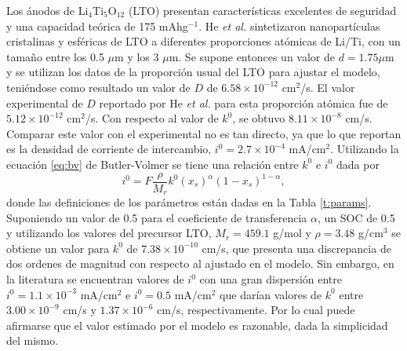 Los ánodos de Li$_4$Ti$_5$O$_{12}$ (LTO) presentan características excelentes
de seguridad y una capacidad teórica de 175 mAhg$^{-1}$. He \textit{et al.} 
\cite{he2012} sintetizaron nanopartículas cristalinas y esféricas de LTO a 
diferentes proporciones atómicas de Li/Ti, con un tamaño entre los 0.5 $\mu$m 
y los 3 $\mu$m. Se supone entonces un valor de $d=1.75 \mu$m y se utilizan los
datos de la proporción usual del LTO para ajustar el modelo, teniéndose como 
resultado un valor de $D$ de $6.58\times10^{-12}$ cm$^2$/s. El valor experimental 
de $D$ reportado por He \textit{et al.} para esta proporción atómica fue de
$5.12\times10^{-12}$ cm$^2$/s. Con respecto al valor de $k^0$, se obtuvo 
$8.11\times10^{-8}$ cm/s. Comparar este valor con el experimental no es tan 
directo, ya que lo que reportan es la densidad de corriente de intercambio, 
$i^0 = 2.7\times10^{-4}$ mA/cm$^2$. Utilizando la ecuación \ref{eq:bv} de 
Butler-Volmer se tiene una relación entre $k^0$ e $i^0$ dada por
\begin{equation}\label{eq:i0k0}
    i^0 = F \frac{\rho}{M_r} k^0 \left(x_s\right)^{\alpha} \left(1 - x_s\right)^{1-\alpha},
\end{equation}
donde las definiciones de los parámetros están dadas en la Tabla \ref{t:params}.
Suponiendo un valor de 0.5 para el coeficiente de transferencia $\alpha$, un 
SOC de 0.5 y utilizando los valores del precursor LTO, $M_r = 459.1$ g/mol y
$\rho = 3.48$ g/cm$^3$ \cite{osti_1284125} se obtiene un valor para $k^0$ de
$7.38\times10^{-10}$ cm/s, que presenta una discrepancia de dos ordenes de 
magnitud con respecto al ajustado en el modelo. Sin embargo, en la literatura
se encuentran valores de $i^0$ con una gran dispersión entre 
$i^0 = 1.1\times10^{-3}$ mA/cm$^2$ \cite{medina2015} e $i^0 = 0.5$ mA/cm$^2$ 
\cite{umirov2019} que darían valores de $k^0$ entre $3.00\times10^{-9}$ cm/s y 
$1.37\times10^{-6}$ cm/s, respectivamente. Por lo cual puede afirmarse que el 
valor estimado por el modelo es razonable, dada la simplicidad del mismo.

